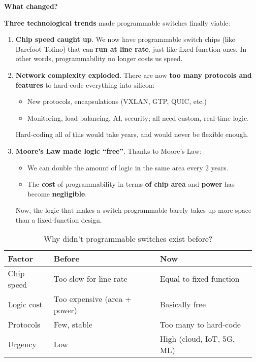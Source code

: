 \highspace
\begin{flushleft}
    \textcolor{Green3}{ \textbf{What changed?}}
\end{flushleft}
\textbf{Three technological trends} made programmable switches finally viable:
\begin{enumerate}
    \item[\textcolor{Green3}{\faIcon{\speedIcon}}] \textcolor{Green3}{\textbf{Chip speed caught up}}. We now have programmable switch chips (like Barefoot Tofino) that can \textbf{run at line rate}, just like fixed-function ones. In other words, programmability no longer costs us speed.
    \item[\textcolor{Red2}{\faIcon{exclamation-triangle}}] \textcolor{Red2}{\textbf{Network complexity exploded}}. There are now \textbf{too many protocols and features} to hard-code everything into silicon:
    \begin{itemize}
        \item New protocols, encapsulations (VXLAN, GTP, QUIC, etc.)
        \item Monitoring, load balancing, AI, security; all need custom, real-time logic.
    \end{itemize}
    Hard-coding all of this would take years, and would never be flexible enough.
    \item[\textcolor{Green3}{\faIcon{check}}] \textcolor{Green3}{\textbf{Moore's Law made logic ``free''}}. Thanks to Moore's Law:
    \begin{itemize}
        \item We can double the amount of logic in the same area every 2 years.
        \item The \textbf{cost} of programmability in terms \textbf{of chip area} and \textbf{power} has become \textbf{negligible}.
    \end{itemize}
    Now, the logic that makes a switch programmable barely takes up more space than a fixed-function design.
\end{enumerate}

\newpage

\begin{table}[!htp]
    \centering
    \begin{tabular}{@{} l | l | l @{}}
        \toprule
        \textbf{Factor} & \textbf{Before}               & \textbf{Now}              \\
        \midrule
        Chip speed      & Too slow for line-rate        & Equal to fixed-function   \\ [.3em]
        Logic cost      & Too expensive (area + power)  & Basically free            \\ [.3em]
        Protocols       & Few, stable                   & Too many to hard-code     \\ [.3em]
        Urgency         & Low                           & High (cloud, IoT, 5G, ML) \\
        \bottomrule
    \end{tabular}
    \caption{Why didn't programmable switches exist before?}
\end{table}